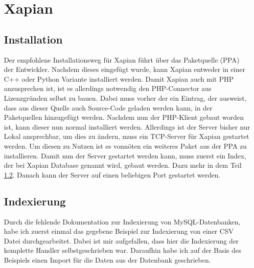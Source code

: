 
\section{Xapian}

\subsection{Installation}

Der empfohlene Installationsweg für Xapian führt über das Paketquelle (PPA) der Entwickler. Nachdem dieses eingefügt wurde, kann Xapian entweder in einer C++ oder Python Variante installiert werden. Damit Xapian auch mit PHP anzusprechen ist, ist es allerdings notwendig den PHP-Connector aus Lizenzgründen selbst zu bauen. Dabei muss vorher der ein Eintrag, der ausweist, dass aus dieser Quelle auch Source-Code geladen werden kann, in der Paketquellen hinzugefügt werden. Nachdem nun der PHP-Klient gebaut worden ist, kann dieser nun normal installiert werden.
Allerdings ist der Server bisher nur Lokal ansprechbar, um dies zu ändern, muss ein TCP-Server für Xapian gestartet werden. Um diesen zu Nutzen ist es vonnöten ein weiteres Paket aus der PPA zu installieren. Damit nun der Server gestartet werden kann, muss zuerst ein Index, der bei Xapian Database genannt wird, gebaut werden. Dazu mehr in dem Teil \ref{xap:index}. Danach kann der Server auf einen beliebigen Port gestartet werden.

\subsection{Indexierung}
\label{xap:index}

Durch die fehlende Dokumentation zur Indexierung von MySQL-Datenbanken, habe ich zuerst einmal das gegebene Beispiel zur Indexierung von einer CSV Datei durchgearbeitet. Dabei ist mir aufgefallen, dass hier die Indexierung der komplette Handler selbstgeschrieben war. Daraufhin habe ich auf der Basis des Beispiels einen Import für die Daten aus der Datenbank geschrieben.

